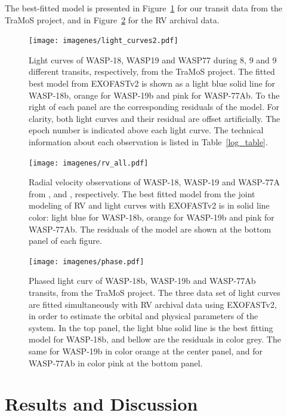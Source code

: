 The best-fitted model is presented in Figure~\ref{transits} for our transit data from the TraMoS project, and in Figure~\ref{rv} for the RV archival data.

\begin{figure}
\centering
\texttt{[image: imagenes/light\_curves2.pdf]}
\caption{Light curves of WASP-18, WASP19 and WASP77 during 8, 9 and 9 different transits, respectively, from the TraMoS project. The fitted best model from EXOFASTv2 is shown as a light blue solid line for WASP-18b, orange for WASP-19b and pink for WASP-77Ab. To the right of each panel are the corresponding residuals of the model. For clarity, both light curves and their residual are offset artificially. The epoch number is indicated above each light curve. The technical information about each observation is listed in Table~\ref{log_table}.}
\label{transits}
\end{figure}

\begin{figure}
\texttt{[image: imagenes/rv\_all.pdf]}
\caption{Radial velocity observations of WASP-18, WASP-19 and WASP-77A from \cite{Hellier2009}, \cite{Hebb2010} and \cite{Maxted2013}, respectively. The best fitted model from the joint modeling of RV and light curves with EXOFASTv2 is in solid line color: light blue for WASP-18b, orange for WASP-19b and pink for WASP-77Ab. The residuals of the model are shown at the bottom panel of each figure.}
\label{rv}
\end{figure}

\begin{figure}
\centering
\texttt{[image: imagenes/phase.pdf]}
\caption{Phased light curv of WASP-18b, WASP-19b and WASP-77Ab transits, from the TraMoS project. The three data set of light curves are fitted simultaneously with RV archival data using EXOFASTv2, in order to estimate the orbital and physical parameters of the system. In the top panel, the light blue solid line is the best fitting model for WASP-18b, and bellow are the residuals in color grey. The same for WASP-19b in color orange at the center panel, and for WASP-77Ab in color pink at the bottom panel.}
\label{phase}
\end{figure}

\section{Results and Discussion}\label{res}

